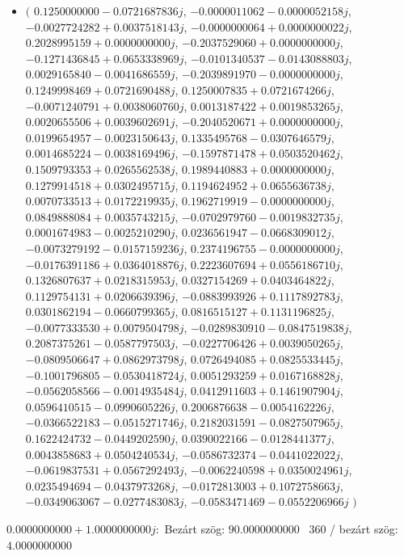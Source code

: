 \documentclass[14pt,a4paper]{article}
\begin{document}
\begin{itemize}
\item
$\big($
$0.1250000000-0.0721687836j$, $-0.0000011062-0.0000052158j$, $-0.0027724282+0.0037518143j$, $-0.0000000064+0.0000000022j$, $0.2028995159+0.0000000000j$, $-0.2037529060+0.0000000000j$, $-0.1271436845+0.0653338969j$, $-0.0101340537-0.0143088803j$, $0.0029165840-0.0041686559j$, $-0.2039891970-0.0000000000j$, $0.1249998469+0.0721690488j$, $0.1250007835+0.0721674266j$, $-0.0071240791+0.0038060760j$, $0.0013187422+0.0019853265j$, $0.0020655506+0.0039602691j$, $-0.2040520671+0.0000000000j$, $0.0199654957-0.0023150643j$, $0.1335495768-0.0307646579j$, $0.0014685224-0.0038169496j$, $-0.1597871478+0.0503520462j$, $0.1509793353+0.0265562538j$, $0.1989440883+0.0000000000j$, $0.1279914518+0.0302495715j$, $0.1194624952+0.0655636738j$, $0.0070733513+0.0172219935j$, $0.1962719919-0.0000000000j$, $0.0849888084+0.0035743215j$, $-0.0702979760-0.0019832735j$, $0.0001674983-0.0025210290j$, $0.0236561947-0.0668309012j$, $-0.0073279192-0.0157159236j$, $0.2374196755-0.0000000000j$, $-0.0176391186+0.0364018876j$, $0.2223607694+0.0556186710j$, $0.1326807637+0.0218315953j$, $0.0327154269+0.0403464822j$, $0.1129754131+0.0206639396j$, $-0.0883993926+0.1117892783j$, $0.0301862194-0.0660799365j$, $0.0816515127+0.1131196825j$, $-0.0077333530+0.0079504798j$, $-0.0289830910-0.0847519838j$, $0.2087375261-0.0587797503j$, $-0.0227706426+0.0039050265j$, $-0.0809506647+0.0862973798j$, $0.0726494085+0.0825533445j$, $-0.1001796805-0.0530418724j$, $0.0051293259+0.0167168828j$, $-0.0562058566-0.0014935484j$, $0.0412911603+0.1461907904j$, $0.0596410515-0.0990605226j$, $0.2006876638-0.0054162226j$, $-0.0366522183-0.0515271746j$, $0.2182031591-0.0827507965j$, $0.1622424732-0.0449202590j$, $0.0390022166-0.0128441377j$, $0.0043858683+0.0504240534j$, $-0.0586732374-0.0441022022j$, $-0.0619837531+0.0567292493j$, $-0.0062240598+0.0350024961j$, $0.0235494694-0.0437973268j$, $-0.0172813003+0.1072758663j$, $-0.0349063067-0.0277483083j$, $-0.0583471469-0.0552206966j$
$\big)$
\end{itemize}
$0.0000000000+1.0000000000j$:\
Bezárt szög: $90.0000000000$ \
360 / bezárt szög: $4.0000000000$\
\end{document}
